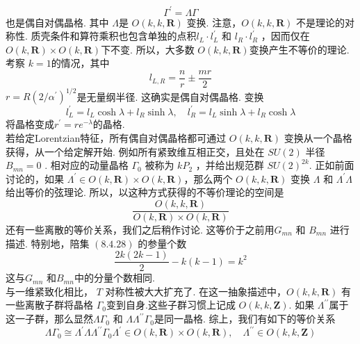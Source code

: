 \begin{equation}
	\Gamma^{\prime}=\Lambda \Gamma
\end{equation}
也是偶自对偶晶格. 其中 $\Lambda $是 $O(k, k, \mathbf{R})$ 变换. 注意，$O(k, k, \mathbf{R})$ 不是理论的对称性. 质壳条件和算符乘积也包含单独的点积$l_{L} \cdot l_{L}^{\prime}$ 和 $l_{R} \cdot l_{R}^{\prime}$ ，因而仅在 $O(k, \mathbf{R}) \times O(k, \mathbf{R})$下不变. 所以，大多数 $O(k, k, \mathbf{R})$变换产生不等价的理论.\\
考察 $k=1$的情况，其中
\begin{equation}
	l_{L, R}=\frac{n}{r} \pm \frac{m r}{2}
\end{equation}
 $r=R\left(2 / \alpha^{\prime}\right)^{1 / 2}$是无量纲半径. 这确实是偶自对偶晶格. 变换
\begin{equation}
	l_{L}^{\prime}=l_{L} \cosh \lambda+l_{R} \sinh \lambda, \quad l_{R}^{\prime}=l_{L} \sinh \lambda+l_{R} \cosh \lambda
\end{equation}
将晶格变成$r^{\prime}=r e^{-\lambda}$的晶格.\\
若给定Lorentzian特征，所有偶自对偶晶格都可通过 $O(k, k, \mathbf{R})$ 变换从一个晶格获得，从一个给定解开始. 例如所有紧致维互相正交，且处在 $S U(2)$ 半径 $B_{m n}=0 $ . 相对应的动量晶格 $\Gamma_{0}$ 被称为 $k P_{2}$ ，并给出规范群 $S U(2)^{2 k}$. 正如前面讨论的，如果 $\Lambda^{\prime} \in O(k, \mathbf{R}) \times O(k, \mathbf{R})$，那么两个 $O(k, k, \mathbf{R})$ 变换 $\Lambda$ 和 $\Lambda^{\prime} \Lambda$给出等价的弦理论. 所以，以这种方式获得的不等价理论的空间是
\begin{equation}
	\frac{O(k, k, \mathbf{R})}{O(k, \mathbf{R}) \times O(k, \mathbf{R})}
\end{equation}
还有一些离散的等价关系，我们之后稍作讨论. 这等价于之前用$G_{m n}$ 和 $B_{m n} $ 进行描述. 特别地，陪集 $(8.4 .28)$ 的参量个数
\begin{equation}
	\frac{2 k(2 k-1)}{2}-k(k-1)=k^{2}
\end{equation}
这与$G_{m n}$ 和$B_{m n}$中的分量个数相同.\\
与一维紧致化相比， $T$ 对称性被大大扩充了. 在这一抽象描述中，$O(k, k, \mathbf{R})$ 有一些离散子群将晶格 $\Gamma_{0}$变到自身.这些子群习惯上记成 $O(k, k, \mathbf{Z})$. 如果 $\Lambda^{\prime \prime}$属于这一子群，那么显然$\Lambda \Gamma_{0}$ 和 $\Lambda \Lambda^{\prime \prime} \Gamma_{0}$是同一晶格. 综上，我们有如下的等价关系
\begin{subequations}
\begin{equation}
		\Lambda \Gamma_{0} \cong \Lambda^{\prime} \Lambda \Lambda^{\prime \prime} \Gamma_{0} 
\end{equation}
\begin{equation}		
		\Lambda^{\prime} \in O(k, \mathbf{R}) \times O(k, \mathbf{R}), \quad \Lambda^{\prime \prime} \in O(k, k, \mathbf{Z})
\end{equation}
\end{subequations}

